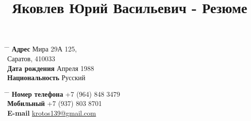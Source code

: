 

\title{Яковлев Юрий Васильевич - Резюме} %


\parbox{0.5\textwidth}{ %
\begin{tabbing} %
\hspace{3cm} \= \hspace{4cm} \= \kill %
{\bf Адрес} \> Мира 29А 125,\\ %
\> Саратов, 410033 \\ %
{\bf Дата рождения}  Апреля 1988 \\ %
{\bf Национальность} \> Русский %
\end{tabbing}}
\hfill %
\parbox{0.5\textwidth}{ %
\begin{tabbing} %
\hspace{3cm} \= \hspace{4cm} \= \kill %
{\bf Номер телефона} \> +7 (964) 848 3479 \\ %
{\bf Мобильный} \> +7 (937) 803 8701 \\ %
{\bf E-mail} \> \href{mailto:krotos139@gmail.com}{krotos139@gmail.com} \\ %
\end{tabbing}}


%
%




